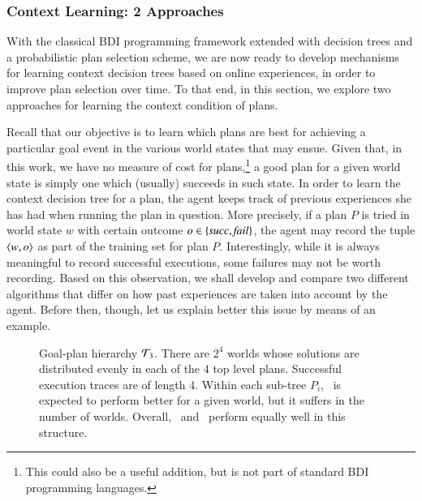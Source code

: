 \subsubsection{Context Learning: 2 Approaches}\label{sec:context_learning}

\newcommand{\success}{\mbox{\emph{succ}}}
\newcommand{\failure}{\mbox{\emph{fail}}}

With the classical BDI programming framework extended with decision trees and a
probabilistic plan selection scheme, we are now ready to develop mechanisms for
learning context decision trees
based on online experiences, in order to improve plan selection over time.
To that end, in this section, we explore two approaches for learning the context
condition of plans.



Recall that our objective is to learn which plans are best for achieving
a particular goal event in the various world states that may ensue. Given that,
in this work, we have no measure of cost for plans,\footnote{This could also be a
useful addition, but is not part of standard BDI programming languages.} a good
plan for a given world state is simply one which (usually) succeeds in such
state. In order to learn the context decision tree for a plan, the agent keeps
track of previous experiences she has had when running the plan in question. More
precisely, if a plan $P$ is tried in world state $w$ with certain outcome $o \in
\{\success,\failure\}$, the agent may record the tuple $\langle w,o \rangle$ as part of
the training set for plan $P$.
Interestingly, while it is always meaningful to record successful executions,
some failures may not be worth recording. Based on this observation, we shall
develop and compare two different algorithms that differ on how past experiences
are taken into account by the agent. Before then, though, let us explain better
this issue by means of an example.
 

\begin{figure}[t]
\begin{center}

\end{center}
\caption{Goal-plan hierarchy ${\mathcal{T}}_3$. There are $2^4$ worlds whose solutions are
distributed evenly in each of the $4$ top level plans. Successful execution
traces are of length $4$. Within each sub-tree $P_i$, \BUL\ is expected to
perform better for a given world, but it suffers in the number of worlds. Overall, \CL\ and \BUL\
perform equally well in this structure.}
\label{fig:T3}
\end{figure}



